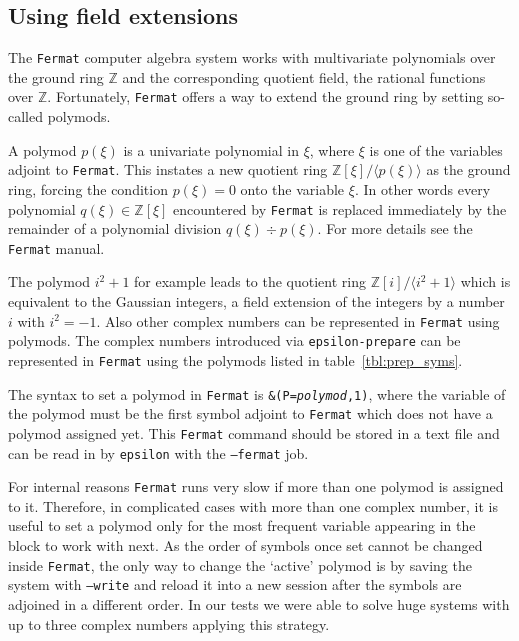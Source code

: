 \documentclass[12pt]{article}
\numberwithin{equation}{section}
\numberwithin{figure}{section}
\begin{document}
    \subsection{Using field extensions} \label{sect:usage_field}
        The \texttt{Fermat} computer algebra system works with multivariate polynomials over the ground ring $\mathds{Z}$ and the corresponding quotient field, the rational functions over $\mathds{Z}$.
        Fortunately, \texttt{Fermat} offers a way to extend the ground ring by setting so-called polymods.

        A polymod $p(\xi)$ is a univariate polynomial in $\xi$, where $\xi$ is one of the variables adjoint to \texttt{Fermat}.
        This instates a new quotient ring $\mathds{Z}[\xi]/\langle p(\xi) \rangle$ as the ground ring, forcing the condition $p(\xi) = 0$ onto the variable $\xi$.
        In other words every polynomial $q(\xi) \in \mathds{Z}[\xi]$ encountered by \texttt{Fermat} is replaced immediately by the remainder of a polynomial division $q(\xi)\div p(\xi)$.
        For more details see the \texttt{Fermat} manual\cite{Lewis:fermat}.

        The polymod $i^2 + 1$ for example leads to the quotient ring $\mathds{Z}[i]/\langle i^2 + 1\rangle$ which is equivalent to the Gaussian integers, a field extension of the integers by a number $i$ with $i^2 = -1$.
        Also other complex numbers can be represented in \texttt{Fermat} using polymods.
        The complex numbers introduced via \texttt{epsilon-prepare} can be represented in \texttt{Fermat} using the polymods listed in table~\ref{tbl:prep_syms}.
       
        The syntax to set a polymod in \texttt{Fermat} is \texttt{\&(P=\textit{polymod},1)}, where the variable of the polymod must be the first symbol adjoint to \texttt{Fermat} which does not have a polymod assigned yet.
        This \texttt{Fermat} command should be stored in a text file and can be read in by \texttt{epsilon} with the \texttt{--fermat} job.

        For internal reasons \texttt{Fermat} runs very slow if more than one polymod is assigned to it.
        Therefore, in complicated cases with more than one complex number, it is useful to set a polymod only for the most frequent variable appearing in the block to work with next.
        As the order of symbols once set cannot be changed inside \texttt{Fermat}, the only way to change the `active' polymod is by saving the system with \texttt{--write} and reload it into a new session after the symbols are adjoined in a different order.
        In our tests we were able to solve huge systems with up to three complex numbers applying this strategy.
\end{document}

